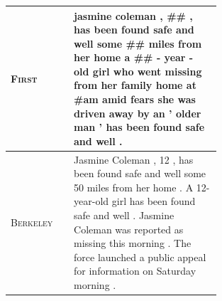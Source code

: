 \documentclass[12pt]{report}
\begin{document}
\begin{figure}[p]
\begin{tabular}{ll p{0.7\linewidth}}
\midrule
\textsc{First} & & jasmine coleman , \#\# , has been found safe and well some \#\# miles from her home a \#\# - year - old girl who went missing from her family home at \#am amid fears she was driven away by an ' older man ' has been found safe and well . \\
\midrule
\textsc{Berkeley} & & Jasmine Coleman , 12 , has been found safe and well some 50 miles from her home . A 12-year-old girl has been found safe and well . Jasmine Coleman was reported as missing this morning . The force launched a public appeal for information on Saturday morning . \\
\midrule


\end{tabular}
\end{figure}
\end{document}
